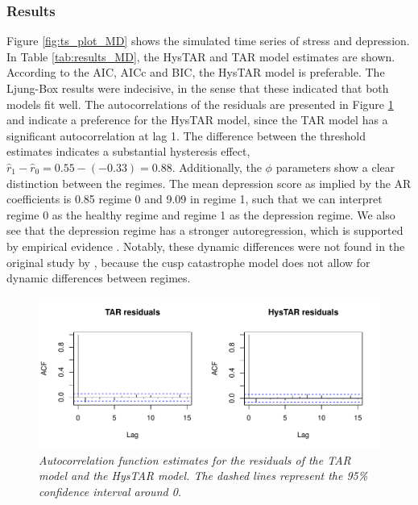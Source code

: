 \documentclass{article}
\begin{document}
\subsubsection{Results}
Figure \ref{fig:ts_plot_MD} shows the simulated time series of stress and depression.
In Table \ref{tab:results_MD}, the HysTAR and TAR model estimates are shown.
According to the AIC, AICc and BIC, the HysTAR model is preferable.
The Ljung-Box results were indecisive, in the sense that these indicated that both models fit well.
The autocorrelations of the residuals are presented in Figure \ref{fig:resplot_MD} and indicate a preference for the HysTAR model, since the TAR model has a significant autocorrelation at lag 1.
The difference between the threshold estimates indicates a substantial hysteresis effect, $\hat{r}_1 - \hat{r}_0 = 0.55 - (-0.33) = 0.88$.
Additionally, the $\phi$ parameters show a clear distinction between the regimes. The mean depression score as implied by the AR coefficients is 0.85 regime 0 and 9.09 in regime 1,
such that we can interpret regime 0 as the healthy regime and regime 1 as the depression regime. We also see that the depression regime has a stronger autoregression, which is supported by empirical evidence \citep{kuppens_emotional_2010, koval_getting_2012}.
Notably, these dynamic differences were not found in the original study by \citet{cramer_major_2016}, because the cusp catastrophe model does not allow for dynamic differences between regimes.

\begin{figure} 
\begin{center}
\includegraphics[scale=.6]{resplot_MD_both}
\caption{\textit{Autocorrelation function estimates for the residuals of the TAR model and the HysTAR model. The dashed lines represent the 95\% confidence interval around 0.}}
\label{fig:resplot_MD}
\end{center}
\end{figure}
\end{document}
